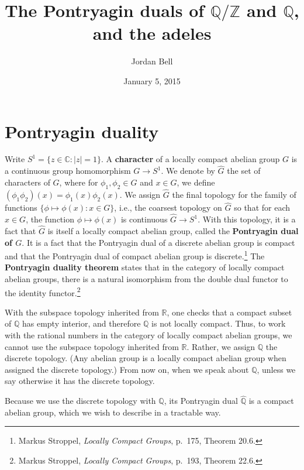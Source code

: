 \documentclass{article}
\theoremstyle{definition}
\theoremstyle{definition}
\begin{document}
\title{The Pontryagin duals of $\mathbb{Q}/\mathbb{Z}$ and $\mathbb{Q}$, and the adeles}
\author{Jordan Bell}
\date{January 5, 2015}

\maketitle



\section{Pontryagin duality}
Write $S^1=\{z \in \mathbb{C}: |z|=1\}$. 
A \textbf{character} of a locally compact abelian group $G$ is a continuous group homomorphism $G \to S^1$.
We denote by $\widehat{G}$ the set of characters of $G$, where for $\phi_1,\phi_2 \in \widehat{G}$ and $x \in G$,
we define $(\phi_1 \phi_2)(x)=\phi_1(x)\phi_2(x)$. We assign $\widehat{G}$ the final topology for the family of functions
$\{\phi \mapsto \phi(x): x \in G\}$, i.e., the coarsest topology on $\widehat{G}$ so that for each $x \in G$, the function $\phi \mapsto \phi(x)$ is continuous
$\widehat{G} \to S^1$. With this topology, it is a fact that $\widehat{G}$ is itself a locally compact abelian group, called  the \textbf{Pontryagin dual of $G$}.
It is a fact that the Pontryagin dual of a discrete abelian group is compact and that the Pontryagin dual of compact abelian group is discrete.\footnote{Markus Stroppel, {\em Locally Compact Groups},
p.~175, Theorem 20.6.}
The \textbf{Pontryagin duality theorem} states that in the category
of locally compact abelian groups, there is a natural
isomorphism from the double dual functor to the identity functor.\footnote{Markus Stroppel, {\em Locally Compact Groups},
p.~193, Theorem 22.6.}


With the subspace topology inherited from
$\mathbb{R}$, one checks that
a compact subset of $\mathbb{Q}$ has empty
interior, and therefore $\mathbb{Q}$ is not locally compact.
Thus, to work with the rational numbers in the category of locally compact abelian groups, we cannot use the subspace topology inherited from
$\mathbb{R}$. Rather, we assign $\mathbb{Q}$ the discrete topology. (Any abelian group is a locally compact abelian group when assigned the discrete
topology.) From now on, when we speak about $\mathbb{Q}$, unless we say otherwise it has the discrete topology.

Because we use the discrete topology with $\mathbb{Q}$, its Pontryagin
dual $\widehat{\mathbb{Q}}$ is a compact abelian group, which we wish to describe in a tractable way. 
\end{document}
